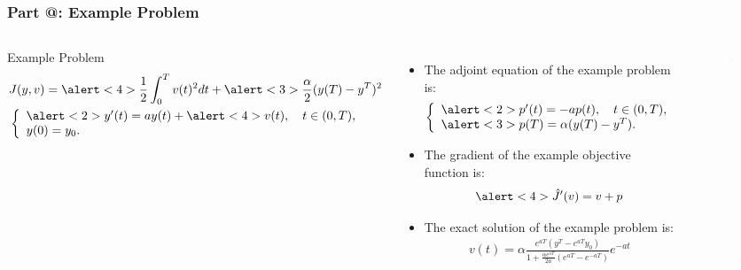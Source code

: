 \documentclass[9pt]{beamer}
\makeatletter
\newcommand*{\rom}[1]{\expandafter\@slowromancap\romannumeral #1@}
\makeatother
\begin{document}
\begin{frame}
\frametitle{\textbf{ Part \rom{1}:} Example Problem}
\begin{columns}
\begin{block}{Example Problem}
\begin{align*}
&J(y,v) = \alert<4>{\frac{1}{2}\int_0^Tv(t)^2dt} + \alert<3>{\frac{\alpha}{2}(y(T)-y^T)^2} \\
&\left\{
     \begin{array}{lr}
       	\alert<2>{y'(t)=ay(t) + \alert<4>{v(t)}}, \quad  t\in(0,T),\\
       	y(0)=y_0.
     \end{array}
   \right. 
\end{align*}
\end{block}
\begin{itemize}
\item{{\small The adjoint equation of the example problem is:}
{\small
\begin{align*}
\left\{
     \begin{array}{lr}
       	\alert<2>{p'(t)=-ap(t)}, \quad  t\in(0,T),\\
       	\alert<3>{p(T)=\alpha(y(T)-y^T)}.
     \end{array}
   \right. 
\end{align*}
}}
\item{{\small The gradient of the example objective function is:}{\small
\begin{align*}
\alert<4>{\hat{J}'(v) = v+p}
\end{align*}
}}
\item{{\small The exact solution of the example problem is:}
{\small 
\begin{align*}
v(t) = \alpha\frac{e^{aT}(y^T-e^{aT}y_0)}{1+\frac{\alpha e^{aT}}{2a}(e^{aT}-e^{-aT})}e^{-at}
\end{align*}}}
\end{itemize}
\begin{figure}
\includegraphics[scale=0.24]{ype.png}

\end{figure}
\end{columns}
\end{frame}
\end{document}
